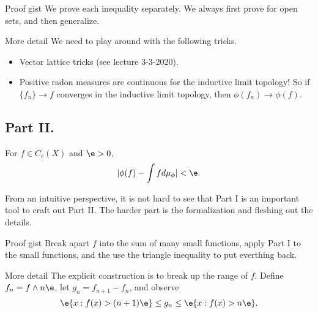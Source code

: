 \begin{details}{Proof gist}
We prove each inequality separately. We always first prove for open sets, and then generalize.
\end{details}
\begin{details}{More detail}
We need to play around with the following tricks.
\begin{itemize}
    \item Vector lattice tricks (see lecture 3-3-2020).
    \item Positive radon measures are continuous for the inductive limit topology! So if $\{f_n\} \rightarrow f$ converges in the inductive limit topology, then $\phi(f_n) \rightarrow \phi(f)$.
\end{itemize}
\end{details}

\subsection{Part II.} 
For $f \in C_c(X)$ and $\e > 0$,
\[
    |\phi(f) - \int f d\mu_\phi| < \e.
\]
\begin{remark}
From an intuitive perspective, it is not hard to see that Part I is an important tool to craft out Part II. The harder part is the formalization and fleshing out the details.
\end{remark}
\begin{details}{Proof gist}
Break apart $f$ into the sum of many small functions, apply Part I to the small functions, and the use the triangle inequality to put everthing back.
\end{details}
\begin{details}{More detail}
The explicit construction is to break up the range of $f$. Define $f_n = f \wedge n\e$, let $g_n = f_{n+1} - f_n$, and observe
\[
    \e \{x: f(x) > (n + 1)\e\} \leq g_n \leq \e \{x: f(x) > n\e\}.
\]
\end{details}
